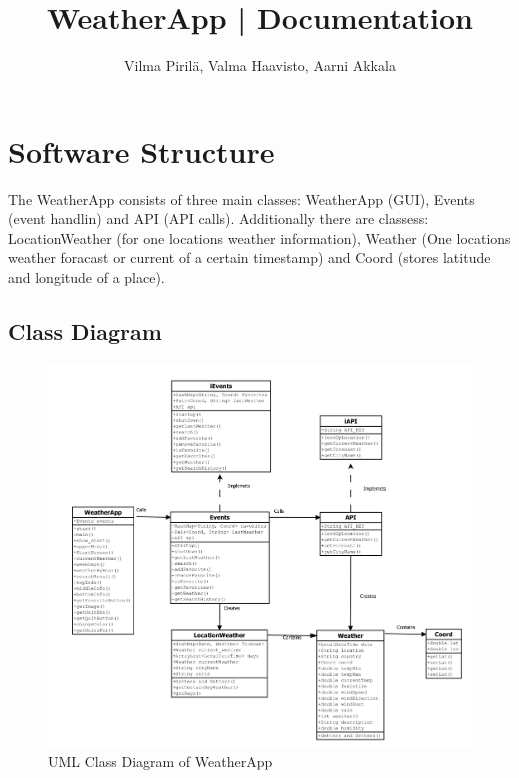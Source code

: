 \documentclass[a4paper,10pt]{article}
\begin{document}
\title{WeatherApp | Documentation}
\author{Vilma Pirilä, Valma Haavisto, Aarni Akkala}

\maketitle

\section{Software Structure}

The WeatherApp consists of three main classes: WeatherApp (GUI), Events (event handlin) and API (API calls). Additionally there are classess: LocationWeather (for one locations weather information), Weather (One locations weather foracast or current of a certain timestamp) and Coord (stores latitude and longitude of a place).

\subsection{Class Diagram}

\begin{figure}[h]
    \centering
    \includegraphics[width=1\textwidth]{class_diagram.pdf}
    \caption{UML Class Diagram of WeatherApp}
    \label{fig:class_diagram}
\end{figure}

\FloatBarrier
\end{document}
